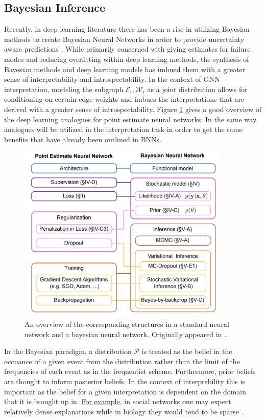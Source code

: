 \subsection{Bayesian Inference}
Recently, in deep learning literature there has been a rise in utilizing Bayesian methods to create Bayesian Neural Networks in order to provide uncertainty aware predictions \cite{jospin_hands-bayesian_2022}. While primarily concerned with giving estimates for failure modes and reducing overfitting within deep learning methods, the synthesis of Bayesian methods and deep learning models has imbued them with a greater sense of interpretability and introspectability. In the context of GNN interpretation, modeling the subgraph $\mathcal{E}_i, \mathcal{W}_i$ as a joint distribution allows for conditioning on certain edge weights and imbues the interpretations that are derived with a greater sense of introspectability. Figure \ref{fig:bnn_overview} gives a good overview of the deep learning analogues for point estimate neural networks. In the same way, analogues will be utilized in the interpretation task in order to get the same benefits that have already been outlined in BNNs.
\begin{figure}[t]
  \centering
  \includegraphics[width=0.9\textwidth]{images/bnn.jpeg}
  \caption{An overview of the corresponding structures in a standard neural network and a bayesian neural network. Originally appeared in \cite{jospin_hands-bayesian_2022}.}
  \label{fig:bnn_overview}
\end{figure}
In the Bayesian paradigm, a distribution $\mathcal{P}$ is treated as the belief in the occuance of a given event from the distribution rather than the limit of the frequencies of each event as in the frequentist scheme. Furthermore, prior beliefs are thought to inform posterior beliefs. In the context of interprebility this is important as the belief for a given interpretation is dependent on the domain that it is brought up in. \hyperref[fig:prior]{For example}, in social networks one may expect relatively dense explanations while in biology they would tend to be sparse \cite{cho_friendship_2011} \cite{petralia_new_2016}.
